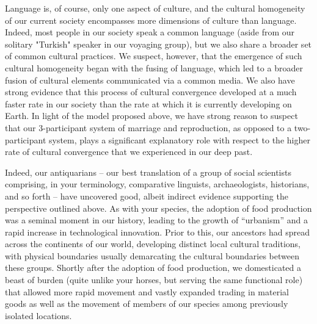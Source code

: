 \documentclass{report}
\begin{document}
Language is, of course, only one aspect of culture, and the cultural homogeneity of our current society encompasses more dimensions of culture than language. Indeed, most people in our society speak a common language (aside from our solitary "Turkish" speaker in our voyaging group), but we also share a broader set of common cultural practices. We suspect, however, that the emergence of such cultural homogeneity began with the fusing of language, which led to a broader fusion of cultural elements communicated via a common media. We also have strong evidence that this process of cultural convergence developed at a much faster rate in our society than the rate at which it is currently developing on Earth. In light of the model proposed above, we have strong reason to suspect that our $3$-participant system of marriage and reproduction, as opposed to a two-participant system, plays a significant explanatory role with respect to the higher rate of cultural convergence that we experienced in our deep past.\par 





Indeed, our antiquarians -- our best translation of a group of social scientists comprising, in your terminology, comparative linguists, archaeologists, historians, and so forth -- have uncovered good, albeit indirect evidence supporting the perspective outlined above. As with your species, the adoption of food production was a seminal moment in our history, leading to the growth of ``urbanism'' and a rapid increase in technological innovation. Prior to this, our ancestors had spread across the continents of our world, developing distinct local cultural traditions, with physical boundaries usually demarcating the cultural boundaries between these groups. Shortly after the adoption of food production, we domesticated a beast of burden (quite unlike your horses, but serving the same functional role) that allowed more rapid movement and vastly expanded trading in material goods as well as the movement of members of our species among previously isolated locations.
\end{document}
